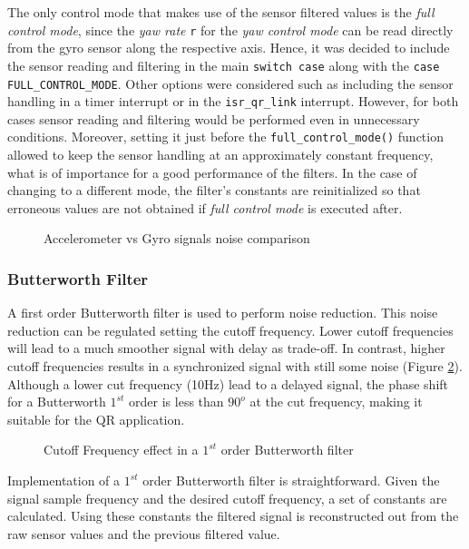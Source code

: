 \documentclass{article}
\begin{document}
The only control mode that makes use of the sensor filtered values is the \textit{full control mode}, since the \textit{yaw rate} \texttt{r} for the \textit{yaw control mode} can be read directly from the gyro sensor along the respective axis. Hence, it was decided to include the sensor reading and filtering in the main \texttt{switch case} along with the \texttt{case FULL\_CONTROL\_MODE}. Other options were considered such as including the sensor handling in a timer interrupt or in the \texttt{isr\_qr\_link} interrupt. However, for both cases sensor reading and filtering would be performed even in unnecessary conditions. Moreover, setting it just before the \texttt{full\_control\_mode()} function allowed to keep the sensor handling at an approximately constant frequency, what is of importance for a good performance of the filters. In the case of changing to a different mode, the filter's constants are reinitialized so that erroneous values are not obtained if \textit{full control mode} is executed after.

\begin{figure}[ht]
\centering
	\caption{Accelerometer vs Gyro signals noise comparison}
	\label{fig.Noise}
\end{figure}

\subsubsection{Butterworth Filter}

A first order Butterworth filter is used to perform noise reduction. This noise reduction can be regulated setting the cutoff frequency. Lower cutoff frequencies will lead to a much smoother signal with delay as trade-off. In contrast, higher cutoff frequencies results in a synchronized signal with still some noise (Figure \ref{fig.NoiseComp}). Although a lower cut frequency (10Hz) lead to a delayed signal, the phase shift for a Butterworth $1^{st}$ order is less than $90^{o}$ at the cut frequency, making it suitable for the QR application. 

\begin{figure}[ht]
\centering
	\caption{Cutoff Frequency effect in a $1^{st}$ order Butterworth filter}
	\label{fig.NoiseComp}
\end{figure}

Implementation of a $1^{st}$ order Butterworth filter is straightforward. Given the signal sample frequency and the desired cutoff frequency, a set of constants are calculated. Using these constants the filtered signal is reconstructed out from the raw sensor values and the previous filtered value.
\end{document}
